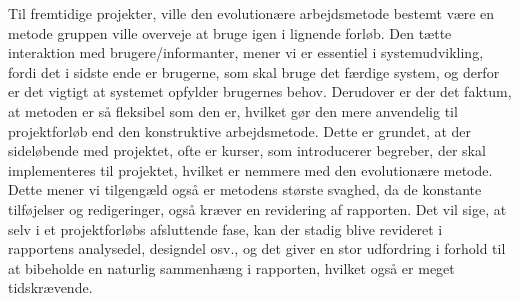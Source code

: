 Til fremtidige projekter, ville den evolutionære arbejdsmetode bestemt være en metode gruppen ville overveje at bruge igen i lignende forløb. Den tætte interaktion med brugere/informanter, mener vi er essentiel i systemudvikling, fordi det i sidste ende er brugerne, som skal bruge det færdige system, og derfor er det vigtigt at systemet opfylder brugernes behov. Derudover er der det faktum, at metoden er så fleksibel som den er, hvilket gør den mere anvendelig til projektforløb end den konstruktive arbejdsmetode. Dette er grundet, at der sideløbende med projektet, ofte er kurser, som introducerer begreber, der skal implementeres til projektet, hvilket er nemmere med den evolutionære metode. Dette mener vi tilgengæld også er metodens største svaghed, da de konstante tilføjelser og redigeringer, også kræver en revidering af rapporten. Det vil sige, at selv i et projektforløbs afsluttende fase, kan der stadig blive revideret i rapportens analysedel, designdel osv., og det giver en stor udfordring i forhold til at bibeholde en naturlig sammenhæng i rapporten, hvilket også er meget tidskrævende.

